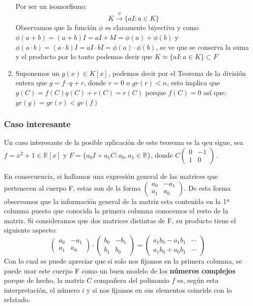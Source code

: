 \documentclass[10pt,a4paper,openright]{book}
\theoremstyle{break}
\begin{document}
\begin{enumerate}
Por ser un isomorfismo:
$$K\stackrel{\phi}{\rightarrow}\{aI: a\in K\}$$
Observamos que la función $\phi$ es claramente biyectiva y como $\phi(a+b)=(a+b)I=aI+bI=\phi(a)+\phi(b)$ y $\phi(a\cdot b)=(a\cdot b)I=aI\cdot bI=\phi(a)\cdot \phi(b)$, se ve que se conserva la suma y el producto por lo tanto podemos decir que $K\simeq \{aI: a\in K\}\subset F$
\vspace{0.5cm}
\item Suponemos un $g(x)\in K[x]$, podemos decir por el Teorema de la división entera que $g=f\cdot q + r$, donde $r=0$ o $gr(r)<n$, esto implica que $g(C)=f(C)q(C)+r(C)=r(C)$ porque $f(C)=0$ así que: $gr(g)=gr(r)<gr(f)$
\end{enumerate}

\subsubsection*{Caso interesante}
Un caso interesante de la posible aplicación de este teorema es la qeu sigue, sea $f=x^2+1\in \mathbb R[x]$ y $F=\{a_0I+a_1C: a_0,a_1\in \mathbb R\}$, donde $C\left(\begin{array}{cc} 0 & -1 \\ 1 & 0 \end{array}\right)$.\par
En consecuencia, si hallamos una expresión general de las matrices que pertenecen al cuerpo F, estas son de la forma $\left(\begin{array}{cc}a_0 & -a_1 \\ a_1 & a_0\end{array}\right)$. De esta forma observamos que la información general de la matriz esta contenida en la 1ª columna puesto que conocida la primera columna conocemos el resto de la matriz. Si consideramos que dos matrices distintas de F, su producto tiene el siguiente aspecto:
$$\left(\begin{array}{cc}a_0 & -a_1 \\ a_1 & a_0\end{array}\right)\cdot \left(\begin{array}{cc}b_0 & -b_1 \\ b_1 & b_0\end{array}\right)=\left(\begin{array}{cc}a_1b_0-a_1b_1 & \cdots \\ a_1b_0+a_0b_1 & \cdots \end{array}\right)$$
Con lo cual se puede apreciar que si solo nos fijamos en la primera columna, se puede usar este cuerpo F como un buen modelo de los \textbf{números complejos} porque de hecho, la matriz $C$ compañera del polinomio $f$ es, según esta interpretación, el número $i$ y si nos fijamos en sus elementos coincide con lo relatado.
\end{document}
